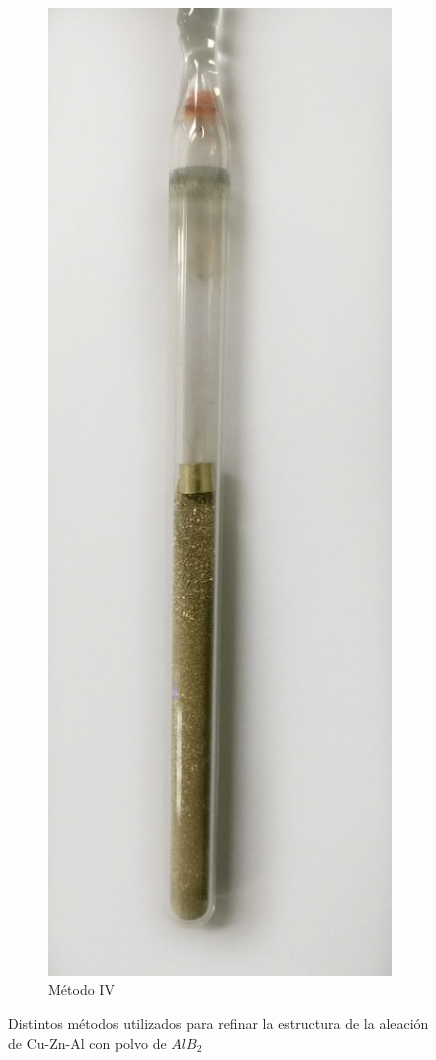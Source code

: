 \documentclass[a4paper,12pt,fleqn,twoside,openany]{book}
\begin{document}
\begin{figure}[h]
\begin{subfigure}{0.1\textwidth}
        \includegraphics[width=\textwidth]{Img/Procedimiento/ClavoPolvo.jpg}
        \caption{Método IV}
        \label{fig:ClavoPolvo}
    \end{subfigure}
 \caption{Distintos métodos utilizados para refinar la estructura de la aleación de Cu-Zn-Al con polvo de $AlB_2$} 
    \end{figure}
    
\end{document}
